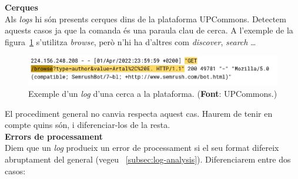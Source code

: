 \clearpage

\noindent
\textbf{Cerques} \\

\noindent
Als \textit{\gls{log}s} hi són presents cerques dins de la plataforma \gls{UPCommons}.
Detectem aquests casos ja que la comanda és una paraula clau de cerca.
A l'exemple de la figura~\ref{fig:log-search} s'utilitza \textit{browse}, però n'hi ha d'altres com \textit{discover}, \textit{search} \dots \\

\begin{figure}[htbp]
    \centerline{\includegraphics[width=\textwidth]{figures/log-search}}
    \captionsetup{justification=centering}
    \caption[Exemple d'un \textit{\gls{log}} d'una cerca a la plataforma.]{Exemple d'un \textit{\gls{log}} d'una cerca a la plataforma. (\textbf{Font}: \gls{UPCommons}.)}\label{fig:log-search}
\end{figure}

\noindent
El procediment general no canvia respecta aquest cas.
Haurem de tenir en compte quins són, i diferenciar-los de la resta. \\

\noindent
\textbf{Errors de processament}\label{subsubsection:log-errors} \\

\noindent
Diem que un \textit{\gls{log}} produeix un error de processament si el seu format difereix abruptament del general (vegeu ~\ref{subsec:log-analysis}).
Diferenciarem entre dos casos:

